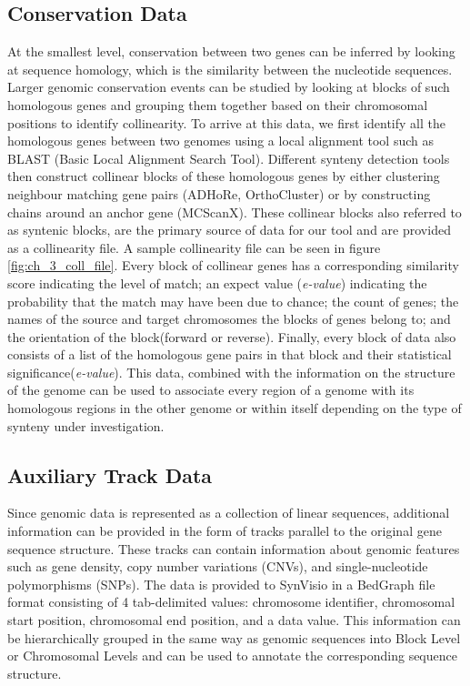 \subsection{Conservation Data}
At the smallest level, conservation between two genes can be inferred by looking at sequence homology, which is the similarity between the nucleotide sequences. Larger genomic conservation events can be studied by looking at blocks of such homologous genes and grouping them together based on their chromosomal positions to identify collinearity. To arrive at this data, we first identify all the homologous genes between two genomes using a local alignment tool such as BLAST (Basic Local Alignment Search Tool)\cite{blasttool}. Different synteny detection tools then construct collinear blocks of these homologous genes by either clustering neighbour matching gene pairs (ADHoRe, OrthoCluster) \cite{proost2011adhore,zeng2008orthocluster} or by constructing chains around an anchor gene (MCScanX)\cite{wang2012mcscanx}. These collinear blocks also referred to as syntenic blocks, are the primary source of data for our tool and are provided as a collinearity file. A sample collinearity file can be seen in figure \ref{fig:ch_3_coll_file}. Every block of collinear genes has a corresponding similarity score indicating the level of match; an expect value (\textit{e-value}) indicating the probability that the match may have been due to chance; the count of genes; the names of the source and target chromosomes the blocks of genes belong to; and the orientation of the block(forward or reverse). Finally, every block of data also consists of a list of the homologous gene pairs in that block and their statistical significance(\textit{e-value}). This data, combined with the information on the structure of the genome can be used to associate every region of a genome with its homologous regions in the other genome or within itself depending on the type of synteny under investigation.

\subsection{Auxiliary Track Data}
Since genomic data is represented as a collection of linear sequences, additional information can be provided in the form of tracks parallel to the original gene sequence structure. These tracks can contain information about genomic features such as gene density, copy number variations (CNVs), and single-nucleotide polymorphisms (SNPs). The data is provided to SynVisio in a BedGraph file format consisting of 4 tab-delimited values: chromosome identifier, chromosomal start position, chromosomal end position, and a data value. This information can be hierarchically grouped in the same way as genomic sequences into Block Level or Chromosomal Levels and can be used to annotate the corresponding sequence structure. 


